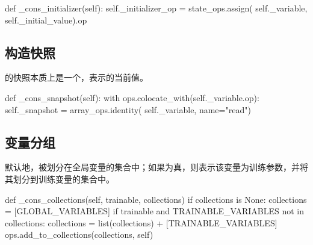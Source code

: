 \begin{content}
\begin{leftbar}
\begin{python}
  def _cons_initializer(self):
    self._initializer_op = state_ops.assign(
      self._variable,
      self._initial_value).op
\end{python}
\end{leftbar}

\subsection{构造快照}

的快照本质上是一个，表示的当前值。

\begin{leftbar}
\begin{python}
  def _cons_snapshot(self):
    with ops.colocate_with(self._variable.op):
      self._snapshot = array_ops.identity(
        self._variable, name="read")
\end{python}
\end{leftbar}

\subsection{变量分组}

默认地，被划分在全局变量的集合中；如果为真，则表示该变量为训练参数，并将其划分到训练变量的集合中。

\begin{leftbar}
\begin{python}
  def _cons_collections(self, trainable, collections)
    if collections is None:
      collections = [GLOBAL_VARIABLES]
    if trainable and TRAINABLE_VARIABLES not in collections:
      collections = list(collections) + [TRAINABLE_VARIABLES]
    ops.add_to_collections(collections, self)
\end{python}
\end{leftbar}

\end{content}